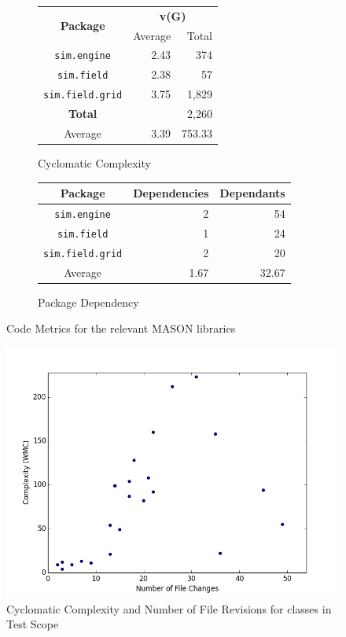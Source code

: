 \documentclass[11pt]{article}
\begin{document}
\begin{figure}[htp]
\begin{subfigure}[b]{0.5\textwidth}
\begin{center}
\begin{tabular}{|c|r|r|}
	\hline
	\multirow{2}{4em}{\textbf{Package}} & \multicolumn{2}{|c|}{\textbf{v(G)}} \\
	\cline{2-3}
	& Average & Total \\
	\hline
	\texttt{sim.engine} & 2.43 & 374 \\
	\texttt{sim.field} & 2.38 & 57 \\
	\texttt{sim.field.grid} & 3.75 & 1,829 \\
	\hline
	\textbf{Total} && 2,260 \\
	\hline
	Average & 3.39 & 753.33 \\
	\hline
\end{tabular}
\end{center}
\caption{Cyclomatic Complexity}
\label{table:cc}
\end{subfigure}
\begin{subfigure}[b]{0.5\textwidth}
\begin{center}
\begin{tabular}{|c|r|r|}
	\hline
	\textbf{Package} & \textbf{Dependencies} & \textbf{Dependants} \\
	\hline
	\texttt{sim.engine} & 2 & 54 \\
	\texttt{sim.field} & 1 & 24 \\
	\texttt{sim.field.grid} & 2 & 20 \\
	\hline
	Average & 1.67 & 32.67 \\
	\hline
\end{tabular}
\end{center}
\caption{Package Dependency}
\label{table:dependency}
\end{subfigure}

\caption{Code Metrics for the relevant MASON libraries}
\label{tables:metrics}
\end{figure}

\begin{figure}[htp]
\centering
\includegraphics[width=\textwidth]{Appendix/complexityVchange}
\caption{Cyclomatic Complexity and Number of File Revisions for classes in Test Scope}
\label{fig:complexityVchange}
\end{figure}
\end{document}
